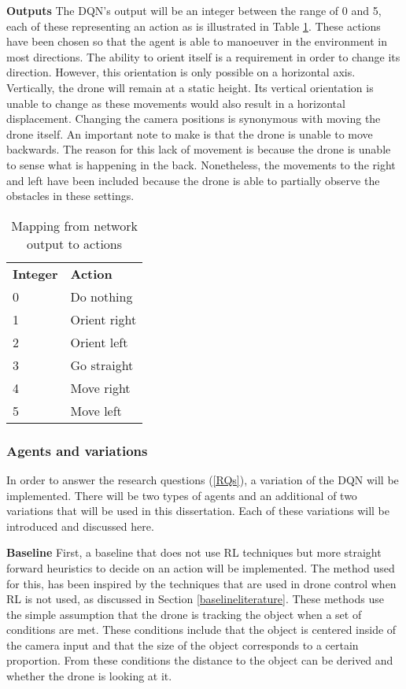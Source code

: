 \noindent
\textbf{Outputs} \newline
The DQN's output will be an integer
between the range of 0 and 5, each of these representing an action as is illustrated in 
Table \ref{fig:actions}. These actions have been chosen so that the agent is able to 
manoeuver in the environment in most directions. The ability to orient itself 
is a requirement in order to change its direction. However, this orientation is only 
possible on a horizontal axis. Vertically, the drone will remain at a static height. Its 
vertical orientation is unable to change as these movements would also result in a horizontal 
displacement. Changing the camera positions is synonymous with moving the drone itself. 
An important note to make is that the drone is unable to move backwards. The reason for 
this lack of movement is because the drone is unable to sense what is happening in the 
back. Nonetheless, the movements to the right and left have been included because the drone 
is able to partially observe the obstacles in these settings. 

\begin{table}[h]
    \caption{Mapping from network output to actions}
    \label{fig:actions}
    \centering
    \begin{tabular}{ll}
    \textbf{Integer} & \textbf{Action} \\
    0                & Do nothing      \\
    1                & Orient right    \\
    2                & Orient left     \\
    3                & Go straight     \\
    4                & Move right      \\
    5                & Move left      
    \end{tabular}
\end{table}

\subsubsection{Agents and variations}
In order to answer the research questions (\ref{RQs}), a variation of the DQN will 
be implemented. There will be two types of agents and an additional of two variations that 
will be used in this dissertation. Each of these variations will be introduced and discussed 
here. \newline

\noindent
\textbf{Baseline} \label{baseline} \newline 
First, a baseline that does not use RL techniques but more straight forward heuristics 
to decide on an action will be implemented. The method used for this, has been inspired by the 
techniques that are used in drone control when RL is not used, as discussed in Section 
\ref{baselineliterature}. These methods use the simple assumption that the drone is 
tracking the object when a set of conditions are met. These conditions include that the 
object is centered inside of the camera input and that the size of the object corresponds 
to a certain proportion. From these conditions the distance to the object can be derived 
and whether the drone is looking at it. 

